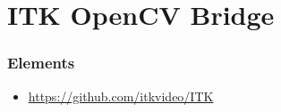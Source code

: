 \section{ITK OpenCV Bridge}




\begin{frame}
\frametitle{Elements}
\begin{itemize}
\item \url{https://github.com/itkvideo/ITK}
\end{itemize}
\end{frame}

